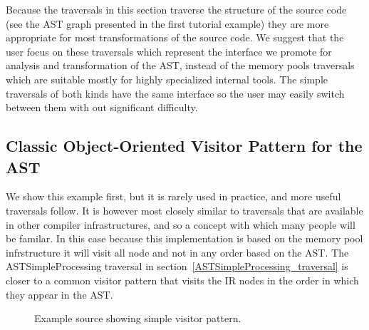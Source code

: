    Because the traversals in this section traverse the structure of
the source code (see the AST graph presented in the first tutorial 
example) they are more appropriate for most transformations
of the source code.  We suggest that the user focus on these 
traversals which represent the interface we promote for analysis
and transformation of the AST, instead of the memory pools traversals
which are suitable mostly for highly specialized internal tools.
The simple traversals of both kinds have the same interface so the user may
easily switch between them with out significant difficulty.

\subsection{Classic Object-Oriented Visitor Pattern for the AST}

   We show this example first, but it is rarely used in practice, and
more useful traversals follow.  It is however most closely similar to
traversals that are available in other compiler infrastructures, and so
a concept with which many people will be familar.  In this case because
this implementation is based on the memory pool infrstructure it will
visit all node and not in any order based on the AST.  The ASTSimpleProcessing
traversal in section~\ref{ASTSimpleProcessing_traversal} is closer to a common 
visitor pattern that visits the IR nodes in the order in which they appear in 
the AST.

\begin{figure}[!h]
{\indent
{\mySmallFontSize

\begin{latexonly}
   
\end{latexonly}

\begin{htmlonly}
   
\end{htmlonly}

}
}
\caption{Example source showing simple visitor pattern.}
\label{Tutorial:exampleClassicVisitorPattern}
\end{figure}

